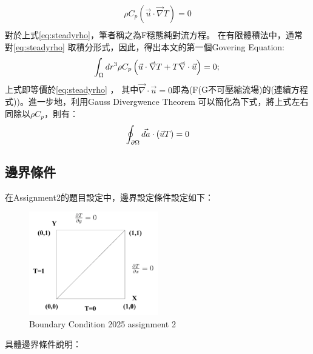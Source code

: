 \documentclass[12pt]{article}
\begin{document}
\begin{equation}\label{eq:steadyrho}\begin{split}
    \rho C_p \left(\vec{u}\cdot \vec{\nabla} T \right) = 0 \\[1.5ex]
\end{split}\end{equation}
對於上式\eqref{eq:steadyrho}，筆者稱之為F穩態純對流方程。
在有限體積法中，通常對\eqref{eq:steadyrho} 取積分形式，因此，得出本文的第一個Govering Equation:
\begin{equation}\label{eq:integration}
\int_{\Omega}dr^{3}\rho C_p \left(\vec{u}\cdot \vec{\nabla} T + T \vec{\nabla }\cdot \vec{u} \right) = 0 ;\\
\end{equation}
上式即等價於\eqref{eq:steadyrho} ， 其中$\vec{\nabla }\cdot \vec{u} = 0$即為(F(G不可壓縮流場)的(連續方程式))。進一步地，利用Gauss Divergwence Theorem 可以簡化為下式，將上式左右同除以$\rho C_p$，則有：
\begin{equation}
    \oint_{\partial \Omega}\vec{da}\cdot  \left(\vec{u}T\right) = 0 \\
\end{equation}
\subsection{邊界條件}
\noindent 在Assignment2的題目設定中，邊界設定條件設定如下：
\begin{figure}[H]
    \centering
    \includegraphics[width=0.5\textwidth]{10.png}
    \caption{Boundary Condition 2025 assignment 2}
    \label{fig:boundary}
\end{figure}
\noindent 具體邊界條件說明：
\end{document}

